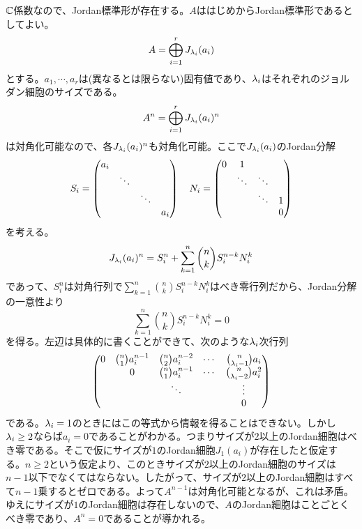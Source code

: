 \subsubsection{} %
\begin{sol}
${\mathbb C}$係数なので、Jordan標準形が存在する。$A$ははじめからJordan標準形であるとしてよい。
\[
A = \bigoplus_{i=1}^r J_{{\lambda}_i}(a_i)
\]
とする。$a_1, \cdots , a_r$は(異なるとは限らない)固有値であり、${\lambda}_i$はそれぞれのジョルダン細胞のサイズである。
\[
A^n = \bigoplus_{i=1}^r J_{{\lambda}_i}(a_i)^n
\]
は対角化可能なので、各$J_{{\lambda}_i}(a_i)^n$も対角化可能。ここで$J_{{\lambda}_i}(a_i)$のJordan分解
\[
S_i = \begin{pmatrix} a_i &  & &  \\  &  \ddots & &  \\ & & \ddots & \\ &  & & a_i \end{pmatrix} \quad N_i = \begin{pmatrix} 0 & 1 & & \\ & \ddots & \ddots & \\ & & \ddots & 1 \\ & & & 0  \end{pmatrix}
\]
を考える。
\[
J_{{\lambda}_i}(a_i)^n = S_i^n + \sum_{k=1}^n \binom{n}{k} S_i^{n-k} N_i^k
\]
であって、$S_i^n$は対角行列で$\sum_{k=1}^n \binom{n}{k} S_i^{n-k} N_i^k$はべき零行列だから、Jordan分解の一意性より
\[
\sum_{k=1}^n \binom{n}{k} S_i^{n-k} N_i^k = 0
\]
を得る。左辺は具体的に書くことができて、次のような${\lambda}_i$次行列
\[
\begin{pmatrix} 
0 & \binom{n}{1} a_i^{n-1} & \binom{n}{2} a_i^{n-2} & \cdots & \binom{n}{{\lambda}_i - 1} a_i \\
  & 0 & \binom{n}{1} a_i^{n-1} & \cdots & \binom{n}{{\lambda}_i - 2} a_i^2 \\
  &   &  \ddots &  & \vdots \\
  &   &        &  &  0
 \end{pmatrix}
\]
である。${\lambda}_i = 1$のときにはこの等式から情報を得ることはできない。しかし${\lambda}_i \geq 2$ならば$a_i = 0$であることがわかる。つまりサイズが$2$以上のJordan細胞はべき零である。そこで仮にサイズが$1$のJordan細胞$J_1(a_i)$が存在したと仮定する。$n \geq 2$という仮定より、このときサイズが$2$以上のJordan細胞のサイズは$n-1$以下でなくてはならない。したがって、サイズが$2$以上のJordan細胞はすべて$n-1$乗するとゼロである。よって$A^{n-1}$は対角化可能となるが、これは矛盾。ゆえにサイズが$1$のJordan細胞は存在しないので、$A$のJordan細胞はことごとくべき零であり、$A^n=0$であることが導かれる。
\end{sol}

\newpage

